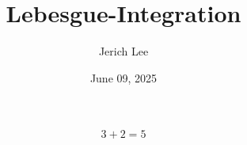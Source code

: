 \documentclass[12pt]{article}
\title{Lebesgue-Integration}
\author{Jerich Lee}
\date{June 09, 2025}
\begin{document}
\maketitle
$$
    3+2=5
$$
\end{document}
